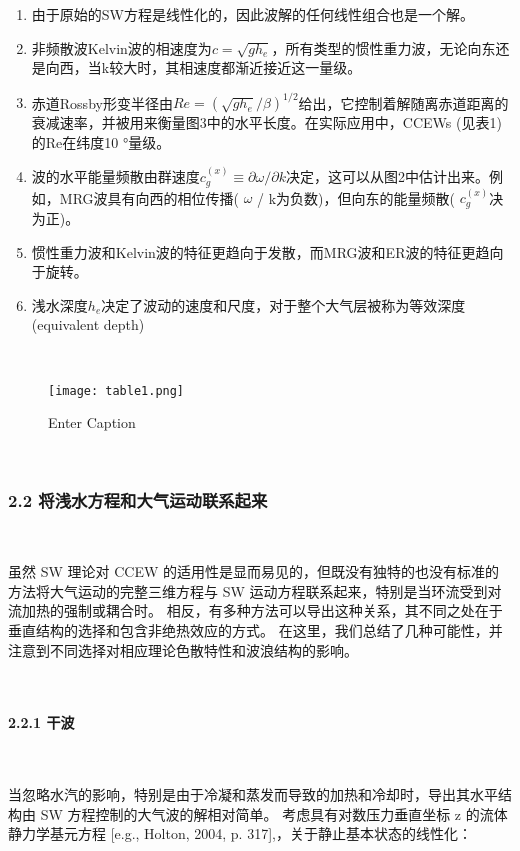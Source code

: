 \documentclass{article}
\begin{document}
\begin{CJK*}{UTF8}{gbsn}
\begin{enumerate}
    \item 由于原始的SW方程是线性化的，因此波解的任何线性组合也是一个解。
    \item 非频散波Kelvin波的相速度为$c=\sqrt{gh_e}$，所有类型的惯性重力波，无论向东还是向西，当k较大时，其相速度都渐近接近这一量级。
    \item 赤道Rossby形变半径由$Re=(\sqrt{gh_e}/\beta)^{1/2}$给出，它控制着解随离赤道距离的衰减速率，并被用来衡量图3中的水平长度。在实际应用中，CCEWs (见表1)的Re在纬度10 °量级。
    \item 波的水平能量频散由群速度$c_g^{(x)}\equiv \partial \omega / \partial k$决定，这可以从图2中估计出来。例如，MRG波具有向西的相位传播( $\omega$ / k为负数)，但向东的能量频散( $c_g^{(x)}$决为正)。
    \item 惯性重力波和Kelvin波的特征更趋向于发散，而MRG波和ER波的特征更趋向于旋转。
    \item 浅水深度$h_e$决定了波动的速度和尺度，对于整个大气层被称为等效深度(equivalent depth)
\end{enumerate}

\ 

\begin{figure}
    \centering
    \texttt{[image: table1.png]}
    \caption{Enter Caption}
    \label{fig:enter-label}
\end{figure}


\ 


\subsubsection*{2.2 将浅水方程和大气运动联系起来}

\ 

虽然 SW 理论对 CCEW 的适用性是显而易见的，但既没有独特的也没有标准的方法将大气运动的完整三维方程与 SW 运动方程联系起来，特别是当环流受到对流加热的强制或耦合时。 相反，有多种方法可以导出这种关系，其不同之处在于垂直结构的选择和包含非绝热效应的方式。 在这里，我们总结了几种可能性，并注意到不同选择对相应理论色散特性和波浪结构的影响。


\ 

\paragraph*{2.2.1 干波}


\ 

当忽略水汽的影响，特别是由于冷凝和蒸发而导致的加热和冷却时，导出其水平结构由 SW 方程控制的大气波的解相对简单。 考虑具有对数压力垂直坐标 z 的流体静力学基元方程 [e.g., Holton, 2004, p. 317],，关于静止基本状态的线性化：



\end{CJK*}
\end{document}
